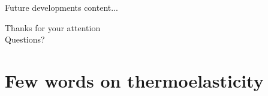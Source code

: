 \documentclass[aspectratio=169]{ISAE-Beamer}
\begin{document}
\begin{frame}{Future developments}
	content...
\end{frame}

\begin{frame}{}
\centering
\Huge Thanks for your attention \\
\Huge Questions?
\end{frame}



\appendix

\begin{frame}
\end{frame}

\begin{frame}
\end{frame}

\section{Few words on thermoelasticity}
\end{document}
